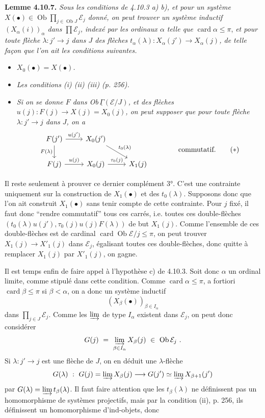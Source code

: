 \documentclass[11pt]{article}
\newcommand{\msp}[1]{\marginpar{\footnotesize [#1]}}
\newcommand{\Ob}{\operatorname{Ob}}
\newcommand{\card}{\operatorname{card}}
\newcommand{\uGamma}{\underline{\Gamma}}
\begin{document}
\textbf{Lemme 4.10.7.} \textit{Sous les conditions de 4.10.3 a) b), et pour un système $X(\bullet)\in\Ob\prod_{j\in\Ob J}\mathcal{E}_j$ donné, on peut trouver un système inductif $(X_\alpha(i))_\alpha$ dans $\prod\mathcal{E}_j$, indexé par les ordinaux $\alpha$ telle que} $\card\alpha\leqslant\pi$, \textit{et pour toute flèche $\lambda : j'\longrightarrow j$ dans $J$ des flèches $t_\alpha(\lambda) : X_\alpha(j')\longrightarrow X_\alpha(j)$, de telle façon que l'on ait les conditions suivantes.} %
\begin{itemize}[leftmargin=3em]
\item[\textit{1°)}] \textit{$X_0(\bullet)=X(\bullet)$.}
\item[\textit{2°)}] \textit{Les conditions (i) (ii) (iii) (p. 256).}
\item[\textit{3°)}] \textit{Si on se donne $F$ dans \textup{Ob}$\,\uGamma(\mathcal{E}/J)$, et des flèches $u(j) : F(j)\longrightarrow X(j)=X_0(j)$, on peut supposer que pour toute flèche $\lambda : j'\longrightarrow j$ dans $J$, on a}
\[
\begin{tikzcd}
F(j') \arrow[r,"u(j')"] \arrow[d,"F(\lambda)"'] & X_0(j') \arrow[dr,"t_0(\lambda)"] & \\
F(j) \arrow[r,"u(j)"] & X_0(j) \arrow[r,"\tau_0(j)"] & X_1(j)
\end{tikzcd}
\qquad\qquad \text{commutatif.}
\tag*{$(*)$}
\]
\end{itemize}

\msp{260}
Il reste seulement à prouver ce dernier complément 3°. C'est une contrainte uniquement sur la construction de $X_1(\bullet)$ et des $t_0(\lambda)$. Supposons donc que l'on ait construit $X_1(\bullet)$ sans tenir compte de cette contrainte. Pour $j$ fixé, il faut donc “rendre commutatif” tous ces carrés, i.e. toutes ces double-flèches $(t_0(\lambda)u(j'),\tau_0(j)u(j)F(\lambda))$ de but $X_1(j)$. Comme l'ensemble de ces double-flèches est de cardinal $\card\Ob\mathcal{E}/j\leqslant\pi$, on peut trouver $X_1(j)\longrightarrow X'_1(j)$ dans $\mathcal{E}_j$, égalisant toutes ces double-flèches, donc quitte à remplacer $X_1(j)$ par $X'_1(j)$, on gagne.

\msp{261}
Il est temps enfin de faire appel à l'hypothèse c) de 4.10.3. Soit donc $\alpha$ un ordinal limite, comme stipulé dans cette condition. Comme $\card\alpha\leqslant\pi$, a fortiori $\card\beta\leqslant\pi$ si $\beta<\alpha$, on a donc un système inductif
\[
(X_\beta(\bullet))_{\beta\in I_\alpha}
\]
dans $\prod_{j\in J}\mathcal{E}_j$. Comme les $\varinjlim$ de type $I_\alpha$ existent dans $\mathcal{E}_j$, on peut donc considérer
\[
G(j)\ =\ \varinjlim_{\beta\in I_\alpha} X_\beta(j)\ \in\ \Ob\mathcal{E}_j\ .
\]
Si $\lambda : j'\longrightarrow j$ est une flèche de $J$, on en déduit une $\lambda$-flèche
\[
G(\lambda)\ :\ G(j)=\varinjlim X_\beta(j) \longrightarrow G(j')\simeq\varinjlim X_{\beta+1}(j')
\]
par $G(\lambda)=\varinjlim t_\beta(\lambda)$. Il faut
\msp{262}
faire attention que les $t_\beta(\lambda)$ ne définissent pas un homomorphisme de systèmes projectifs, mais par la condition (ii), p. 256, ils définissent un homomorphisme d'ind-objets, donc
\end{document}

